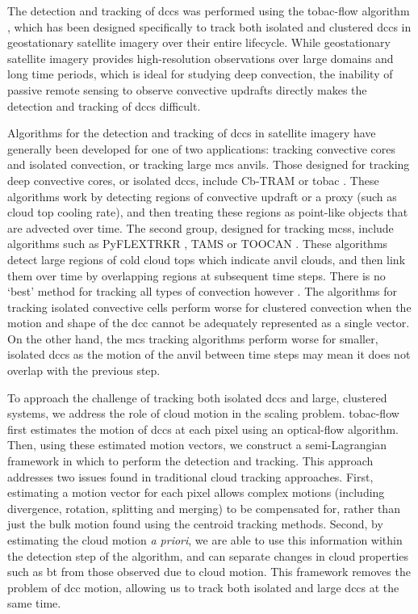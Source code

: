 \documentclass[acp, manuscript]{copernicus}
\begin{document}
The detection and tracking of \acrshort{dcc}s was performed using the tobac-flow algorithm \citep{jones_semilagrangian_2023}, which has been designed specifically to track both isolated and clustered \acrshort{dcc}s in geostationary satellite imagery over their entire lifecycle. 
While geostationary satellite imagery provides high-resolution observations over large domains and long time periods, which is ideal for studying deep convection, the inability of passive remote sensing to observe convective updrafts directly makes the detection and tracking of \acrshort{dcc}s difficult.

Algorithms for the detection and tracking of \acrshort{dcc}s in satellite imagery have generally been developed for one of two applications: tracking convective cores and isolated convection, or tracking large \acrshort{mcs} anvils.
Those designed for tracking deep convective cores, or isolated \acrshort{dcc}s, include Cb-TRAM \citep{zinner_cbtram_2008,zinner_validation_2013} or tobac \citep{heikenfeld_tobac_2019}.
These algorithms work by detecting regions of convective updraft or a proxy (such as cloud top cooling rate), and then treating these regions as point-like objects that are advected over time. 
The second group, designed for tracking \acrshort{mcs}s, include algorithms such as PyFLEXTRKR \citep{feng_pyflextrkr_2022}, TAMS \citep{nunezocasio_tracking_2020} or TOOCAN \citep{fiolleau_algorithm_2013}. 
These algorithms detect large regions of cold cloud tops which indicate anvil clouds, and then link them over time by overlapping regions at subsequent time steps. 
There is no `best' method for tracking all types of convection however \citep{lakshmanan_objective_2010}. 
The algorithms for tracking isolated convective cells perform worse for clustered convection when the motion and shape of the \acrshort{dcc} cannot be adequately represented as a single vector. 
On the other hand, the \acrshort{mcs} tracking algorithms perform worse for smaller, isolated \acrshort{dcc}s as the motion of the anvil between time steps may mean it does not overlap with the previous step.

To approach the challenge of tracking both isolated \acrshort{dcc}s and large, clustered systems, we address the role of cloud motion in the scaling problem. 
tobac-flow first estimates the motion of \acrshort{dcc}s at each pixel using an optical-flow algorithm. 
Then, using these estimated motion vectors, we construct a semi-Lagrangian framework in which to perform the detection and tracking. 
This approach addresses two issues found in traditional cloud tracking approaches.
First, estimating a motion vector for each pixel allows complex motions (including divergence, rotation, splitting and merging) to be compensated for, rather than just the bulk motion found using the centroid tracking methods.
Second, by estimating the cloud motion \textit{a priori}, we are able to use this information within the detection step of the algorithm, and can separate changes in cloud properties such as \acrshort{bt} from those observed due to cloud motion.
This framework removes the problem of \acrshort{dcc} motion, allowing us to track both isolated and large \acrshort{dcc}s at the same time.
\end{document}
